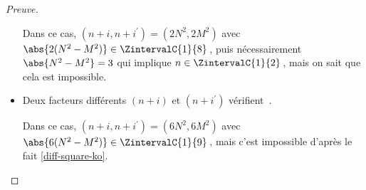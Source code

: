 \begin{proof}[Preuve]
\begin{itemize}
		\smallskip
		\noindent
		Dans ce cas, $(n+i, n+i^\prime) = (2 N^2, 2 M^2)$ avec $\abs{2(N^2 - M^2)} \in \ZintervalC{1}{8}$\,, puis nécessairement $\abs{N^2 - M^2} = 3$ qui implique $n \in \ZintervalC{1}{2}$\,, mais on sait que cela est impossible.


    	\medskip
		\item Deux facteurs différents $(n+i)$ et $(n+i^\prime)$ vérifient \,.
		
		\smallskip
		\noindent
		Dans ce cas, $(n+i, n+i^\prime) = (6 N^2, 6 M^2)$ avec $\abs{6(N^2 - M^2)} \in \ZintervalC{1}{9}$\,, mais c'est impossible d'après le fait \ref{diff-square-ko}.
    \end{itemize}
\end{proof}

